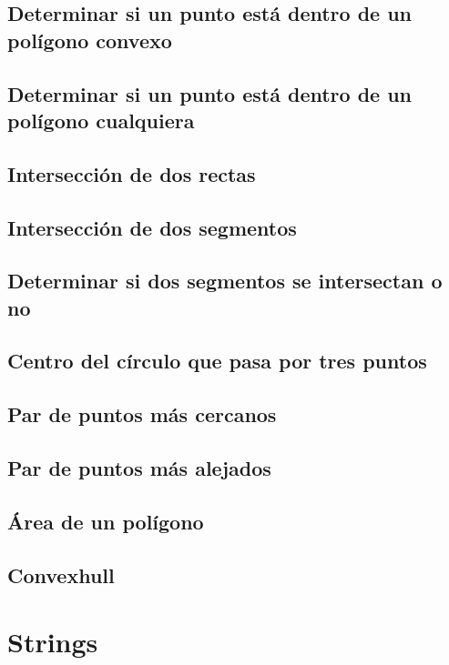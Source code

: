 \documentclass[10pt,letterpaper,twocolumn,twosided]{article}
\begin{document}
\subsection{Determinar si un punto está dentro de un polígono convexo}

\subsection{Determinar si un punto está dentro de un polígono cualquiera}

\subsection{Intersección de dos rectas}

\subsection{Intersección de dos segmentos}

\subsection{Determinar si dos segmentos se intersectan o no}

\subsection{Centro del círculo que pasa por tres puntos}

\subsection{Par de puntos más cercanos}

\subsection{Par de puntos más alejados}

\subsection{Área de un polígono}

\subsection{Convexhull}

\section{Strings}
\end{document}
